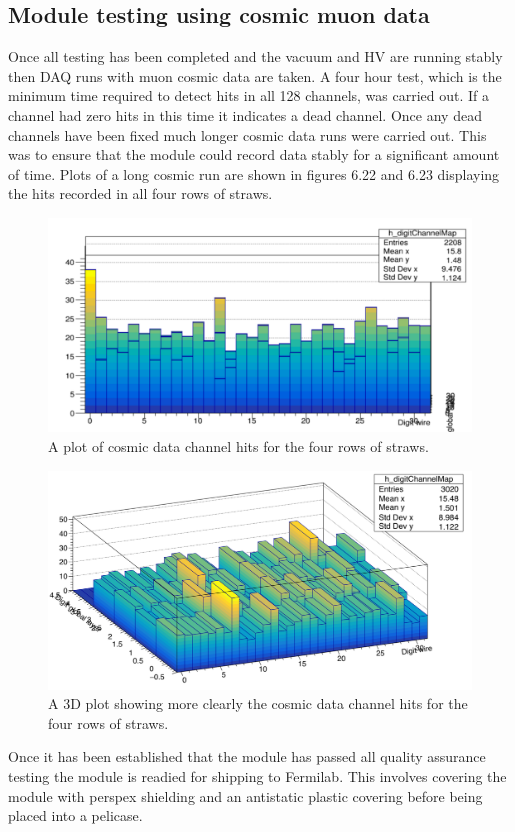 \subsection{ Module testing using cosmic muon data}

Once all testing has been completed and the vacuum and HV are running stably then DAQ runs with muon cosmic data are taken. A four hour test, which is the minimum time required to detect hits in all 128 channels, was carried out. If a channel had zero hits in this time it indicates a dead channel. Once any dead channels have been fixed much longer cosmic data runs were carried out. This was to ensure that the module could record data stably for a significant amount of time. Plots of a long cosmic run are shown in figures 6.22 and 6.23 displaying the hits recorded in all four rows of straws.

\begin{figure}[th]
\centering
\includegraphics[scale=0.75]{Figures/cosmicdata1}
\decoRule
\caption{A plot of cosmic data channel hits for the four rows of straws.}
\label{fig:cosmicdata1}
\end{figure}

\begin{figure}[th]
\centering
\includegraphics[scale=0.4]{Figures/cosmic4rows.png}
\decoRule
\caption{A 3D plot showing more clearly the cosmic data channel hits for the four rows of straws.}
\label{fig:cosmic4rows}
\end{figure}

Once it has been established that the module has passed all quality assurance testing the module is readied for shipping to Fermilab. This involves covering the module with perspex shielding and an antistatic plastic covering before being placed into a pelicase.


